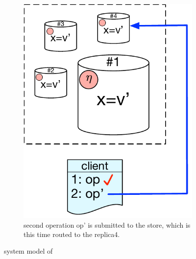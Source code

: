 \begin{figure}[t]
\begin{subfigure}[t]{0.31\textwidth}
	\includegraphics[scale=0.36]{Figures/system_model3.pdf}
        \caption{second operation op' is submitted to the store, which
	is this time routed to the replica4.}
        \label{fig:sys_model3}
    \end{subfigure}
    \caption{system model of \tool}\label{fig:system_model}
\end{figure}
